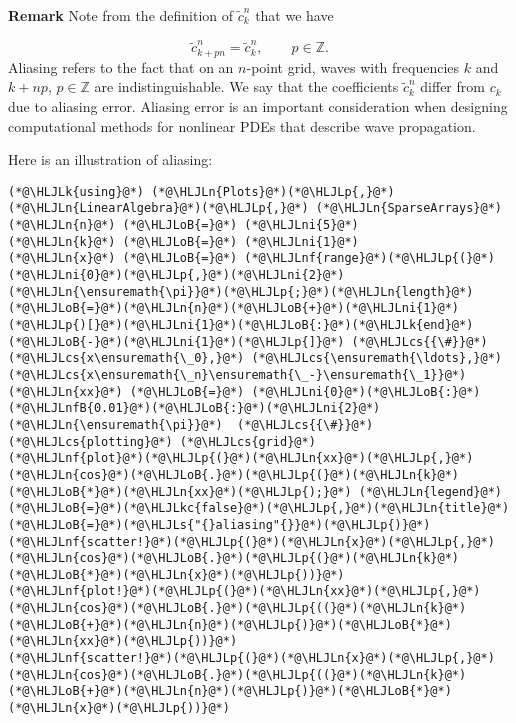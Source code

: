 \documentclass[12pt,a4paper]{article}
\newcommand{\HLJLk}[1]{\textcolor[RGB]{148,91,176}{\textbf{#1}}}
\newcommand{\HLJLkc}[1]{\textcolor[RGB]{59,151,46}{\textit{#1}}}
\newcommand{\HLJLn}[1]{#1}
\newcommand{\HLJLnf}[1]{\textcolor[RGB]{66,102,213}{#1}}
\newcommand{\HLJLs}[1]{\textcolor[RGB]{201,61,57}{#1}}
\newcommand{\HLJLnfB}[1]{\textcolor[RGB]{59,151,46}{#1}}
\newcommand{\HLJLni}[1]{\textcolor[RGB]{59,151,46}{#1}}
\newcommand{\HLJLoB}[1]{\textcolor[RGB]{102,102,102}{\textbf{#1}}}
\newcommand{\HLJLp}[1]{#1}
\newcommand{\HLJLcs}[1]{\textcolor[RGB]{153,153,119}{\textit{#1}}}
\begin{document}
\textbf{Remark} Note from the definition of $\tilde{c}^n_{k}$ that we have

\[
\tilde{c}^n_{k+pn} = \tilde{c}^n_{k}, \qquad p \in \mathbb{Z}.  
\]
Aliasing refers to the fact that on an $n$-point grid, waves with frequencies $k$ and $k + np$, $p \in \mathbb{Z}$ are indistinguishable.  We say that the coefficients $\tilde{c}^n_k$ differ from $c_k$ due to aliasing error.  Aliasing error is an important consideration when designing computational methods for nonlinear PDEs that describe wave propagation.

Here is an illustration of aliasing:


\begin{lstlisting}
(*@\HLJLk{using}@*) (*@\HLJLn{Plots}@*)(*@\HLJLp{,}@*) (*@\HLJLn{LinearAlgebra}@*)(*@\HLJLp{,}@*) (*@\HLJLn{SparseArrays}@*)
(*@\HLJLn{n}@*) (*@\HLJLoB{=}@*) (*@\HLJLni{5}@*)
(*@\HLJLn{k}@*) (*@\HLJLoB{=}@*) (*@\HLJLni{1}@*)
(*@\HLJLn{x}@*) (*@\HLJLoB{=}@*) (*@\HLJLnf{range}@*)(*@\HLJLp{(}@*)(*@\HLJLni{0}@*)(*@\HLJLp{,}@*)(*@\HLJLni{2}@*)(*@\HLJLn{\ensuremath{\pi}}@*)(*@\HLJLp{;}@*)(*@\HLJLn{length}@*)(*@\HLJLoB{=}@*)(*@\HLJLn{n}@*)(*@\HLJLoB{+}@*)(*@\HLJLni{1}@*)(*@\HLJLp{)[}@*)(*@\HLJLni{1}@*)(*@\HLJLoB{:}@*)(*@\HLJLk{end}@*)(*@\HLJLoB{-}@*)(*@\HLJLni{1}@*)(*@\HLJLp{]}@*) (*@\HLJLcs{{\#}}@*) (*@\HLJLcs{x\ensuremath{\_0},}@*) (*@\HLJLcs{\ensuremath{\ldots},}@*) (*@\HLJLcs{x\ensuremath{\_n}\ensuremath{\_-}\ensuremath{\_1}}@*) 
(*@\HLJLn{xx}@*) (*@\HLJLoB{=}@*) (*@\HLJLni{0}@*)(*@\HLJLoB{:}@*)(*@\HLJLnfB{0.01}@*)(*@\HLJLoB{:}@*)(*@\HLJLni{2}@*)(*@\HLJLn{\ensuremath{\pi}}@*)  (*@\HLJLcs{{\#}}@*) (*@\HLJLcs{plotting}@*) (*@\HLJLcs{grid}@*)
(*@\HLJLnf{plot}@*)(*@\HLJLp{(}@*)(*@\HLJLn{xx}@*)(*@\HLJLp{,}@*)(*@\HLJLn{cos}@*)(*@\HLJLoB{.}@*)(*@\HLJLp{(}@*)(*@\HLJLn{k}@*)(*@\HLJLoB{*}@*)(*@\HLJLn{xx}@*)(*@\HLJLp{);}@*) (*@\HLJLn{legend}@*)(*@\HLJLoB{=}@*)(*@\HLJLkc{false}@*)(*@\HLJLp{,}@*)(*@\HLJLn{title}@*)(*@\HLJLoB{=}@*)(*@\HLJLs{"{}aliasing"{}}@*)(*@\HLJLp{)}@*)
(*@\HLJLnf{scatter!}@*)(*@\HLJLp{(}@*)(*@\HLJLn{x}@*)(*@\HLJLp{,}@*)(*@\HLJLn{cos}@*)(*@\HLJLoB{.}@*)(*@\HLJLp{(}@*)(*@\HLJLn{k}@*)(*@\HLJLoB{*}@*)(*@\HLJLn{x}@*)(*@\HLJLp{))}@*)
(*@\HLJLnf{plot!}@*)(*@\HLJLp{(}@*)(*@\HLJLn{xx}@*)(*@\HLJLp{,}@*)(*@\HLJLn{cos}@*)(*@\HLJLoB{.}@*)(*@\HLJLp{((}@*)(*@\HLJLn{k}@*)(*@\HLJLoB{+}@*)(*@\HLJLn{n}@*)(*@\HLJLp{)}@*)(*@\HLJLoB{*}@*)(*@\HLJLn{xx}@*)(*@\HLJLp{))}@*)
(*@\HLJLnf{scatter!}@*)(*@\HLJLp{(}@*)(*@\HLJLn{x}@*)(*@\HLJLp{,}@*)(*@\HLJLn{cos}@*)(*@\HLJLoB{.}@*)(*@\HLJLp{((}@*)(*@\HLJLn{k}@*)(*@\HLJLoB{+}@*)(*@\HLJLn{n}@*)(*@\HLJLp{)}@*)(*@\HLJLoB{*}@*)(*@\HLJLn{x}@*)(*@\HLJLp{))}@*)
\end{lstlisting}
\end{document}
